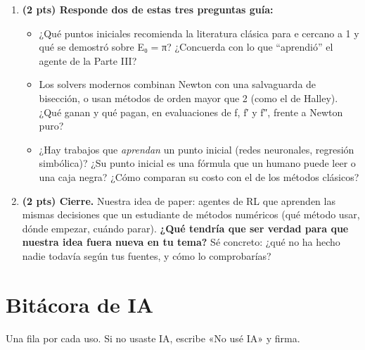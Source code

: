 \begin{enumerate}
\def\labelenumi{\arabic{enumi}.}
\setcounter{enumi}{2}
\tightlist
\item
  \textbf{(2 pts) Responde dos de estas tres preguntas guía:}

  \begin{itemize}
  \tightlist
  \item
    ¿Qué puntos iniciales recomienda la literatura clásica para e cercano a 1 y qué se demostró sobre E₀ = π? ¿Concuerda con lo que ``aprendió'' el agente de la Parte III?
  \item
    Los solvers modernos combinan Newton con una salvaguarda de bisección, o usan métodos de orden mayor que 2 (como el de Halley). ¿Qué ganan y qué pagan, en evaluaciones de f, f′ y f″, frente a Newton puro?
  \item
    ¿Hay trabajos que \emph{aprendan} un punto inicial (redes neuronales, regresión simbólica)? ¿Su punto inicial es una fórmula que un humano puede leer o una caja negra? ¿Cómo comparan su costo con el de los métodos clásicos?
  \end{itemize}
\item
  \textbf{(2 pts) Cierre.} Nuestra idea de paper: agentes de RL que aprenden las mismas decisiones que un estudiante de métodos numéricos (qué método usar, dónde empezar, cuándo parar). \textbf{¿Qué tendría que ser verdad para que nuestra idea fuera nueva en tu tema?} Sé concreto: ¿qué no ha hecho nadie todavía según tus fuentes, y cómo lo comprobarías?
\end{enumerate}

\section{Bitácora de IA}

Una fila por cada uso. Si no usaste IA, escribe «No usé IA» y firma.

